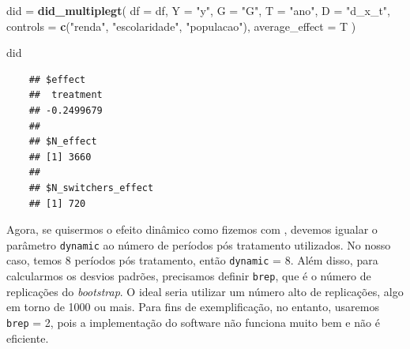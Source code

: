 \documentclass[portugues]{article}
\newenvironment{Shaded}{\begin{snugshade}}{\end{snugshade}}
\newcommand{\AttributeTok}[1]{\textcolor[rgb]{0.13,0.29,0.53}{#1}}
\newcommand{\FunctionTok}[1]{\textcolor[rgb]{0.13,0.29,0.53}{\textbf{#1}}}
\newcommand{\NormalTok}[1]{#1}
\newcommand{\OtherTok}[1]{\textcolor[rgb]{0.56,0.35,0.01}{#1}}
\newcommand{\StringTok}[1]{\textcolor[rgb]{0.31,0.60,0.02}{#1}}
\begin{document}
\begin{box_code}

\begin{Shaded}

    \begin{Highlighting}[]
    \NormalTok{did }\OtherTok{=} \FunctionTok{did\_multiplegt}\NormalTok{(}
      \AttributeTok{df =}\NormalTok{ df,}
      \AttributeTok{Y =} \StringTok{"y"}\NormalTok{,}
      \AttributeTok{G =} \StringTok{"G"}\NormalTok{,}
      \AttributeTok{T =} \StringTok{"ano"}\NormalTok{,}
      \AttributeTok{D =} \StringTok{"d\_x\_t"}\NormalTok{,}
      \AttributeTok{controls =} \FunctionTok{c}\NormalTok{(}\StringTok{"renda"}\NormalTok{, }\StringTok{"escolaridade"}\NormalTok{, }\StringTok{"populacao"}\NormalTok{),}
      \AttributeTok{average\_effect =}\NormalTok{ T}
    \NormalTok{)}
    
    \NormalTok{did}
    \end{Highlighting}
    \end{Shaded}

    \begin{verbatim}
    ## $effect
    ##  treatment 
    ## -0.2499679 
    ## 
    ## $N_effect
    ## [1] 3660
    ## 
    ## $N_switchers_effect
    ## [1] 720
    \end{verbatim}
    

\end{box_code}

Agora, se quisermos o efeito dinâmico como fizemos com \citet{callaway2021difference, sun2021estimating}, devemos igualar o parâmetro \texttt{dynamic} ao número de períodos pós tratamento utilizados. No nosso caso, temos 8 períodos pós tratamento, então \texttt{dynamic} = 8. Além disso, para calcularmos os desvios padrões, precisamos definir \texttt{brep}, que é o número de replicações do \textit{bootstrap}. O ideal seria utilizar um número alto de replicações, algo em torno de 1000 ou mais. Para fins de exemplificação, no entanto, usaremos \texttt{brep} = 2, pois a implementação do software não funciona muito bem e não é eficiente.
\end{document}
